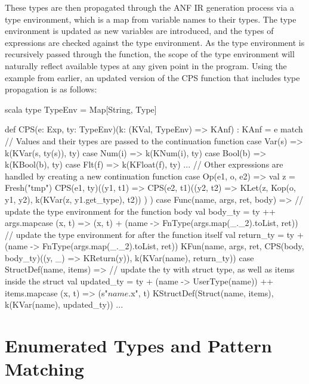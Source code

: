 These types are then propagated through the ANF IR generation process via a type environment, which
is a map from variable names to their types. The type environment is updated as new variables are
introduced, and the types of expressions are checked against the type environment. As the type
environment is recursively passed through the function, the scope of the type environment will
naturally reflect available types at any given point in the program. Using the example from earlier,
an updated version of the CPS function that includes type propagation is as follows:

\begin{code}{scala}
    type TypeEnv = Map[String, Type]

    def CPS(e: Exp, ty: TypeEnv)(k: (KVal, TypeEnv) => KAnf) : KAnf = e match {
        // Values and their types are passed to the continuation function
        case Var(s) => k(KVar(s, ty(s)), ty)
        case Num(i) => k(KNum(i), ty)
        case Bool(b) => k(KBool(b), ty)
        case Flt(f) => k(KFloat(f), ty)
        ...
        // Other expressions are handled by creating a new continuation function
        case Op(e1, o, e2) => {
            val z = Fresh("tmp")
            CPS(e1, ty)((y1, t1) =>
                CPS(e2, t1)((y2, t2) =>
                    KLet(z, Kop(o, y1, y2), k(KVar(z, y1.get_type), t2))
                )
            )
        }
        case Func(name, args, ret, body) => {
            // update the type environment for the function body
            val body_ty = ty
                ++ args.map{case (x, t) => (x, t)}
                + (name -> FnType(args.map(_._2).toList, ret))
            // update the type environment for after the function itself
            val return_ty = ty
                + (name -> FnType(args.map(_._2).toList, ret))
            KFun(name, args, ret, CPS(body, body_ty)((y, _) => KReturn(y)), k(KVar(name), return_ty))
        }
        case StructDef(name, items) =>
            // update the ty with struct type, as well as items inside the struct
            val updated_ty = ty
                + (name -> UserType(name))
                ++ items.map{case (x, t) => (s"$name.$x", t)}
            KStructDef(Struct(name, items), k(KVar(name), updated_ty))
        ...
    }
\end{code}

\section{Enumerated Types and Pattern Matching}

